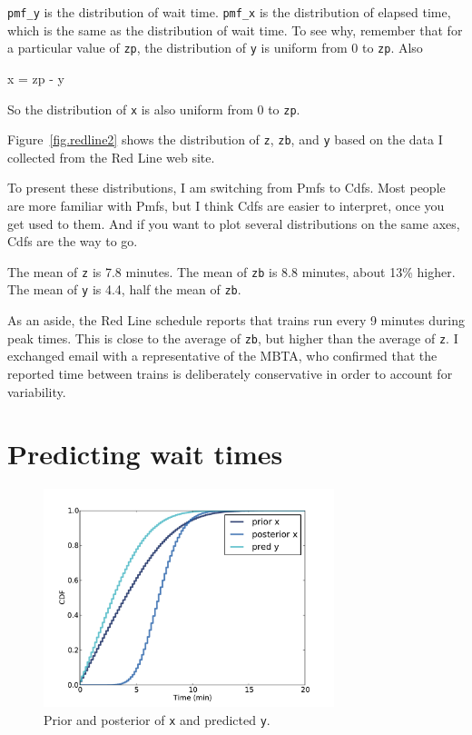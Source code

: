 \documentclass[12pt]{book}
\theoremstyle{exercise}
\begin{document}
\verb"pmf_y" is the distribution of wait time.  \verb"pmf_x" is the
distribution of elapsed time, which is the same as the distribution of
wait time.  To see why, remember that for a particular value of
{\tt zp}, the distribution of {\tt y} is uniform from 0 to {\tt zp}.
Also
%
\begin{code}
x = zp - y
\end{code}
%
So the distribution of {\tt x} is also uniform from 0 to {\tt zp}.

Figure~\ref{fig.redline2} shows the distribution of {\tt z}, {\tt zb},
and {\tt y} based on the data I collected from the Red Line web site.

To present these distributions, I am switching from Pmfs to Cdfs.
Most people are more familiar with Pmfs, but I think Cdfs are easier
to interpret, once you get used to them.  And if you want to plot
several distributions on the same axes, Cdfs are the way to go.

The mean of {\tt z} is 7.8 minutes.  The mean of {\tt zb} is 8.8
minutes, about 13\% higher.  The mean of {\tt y} is 4.4, half
the mean of {\tt zb}.

As an aside, the Red Line schedule reports that trains run every
9 minutes during peak times.  This is close to the average of
{\tt zb}, but higher than the average of {\tt z}.  I exchanged email
with a representative of the MBTA, who confirmed that the reported
time between trains is deliberately conservative in order to
account for variability.


\section{Predicting wait times}
\label{elapsed}

\begin{figure}
\centerline{\includegraphics[height=2.5in]{figs/redline3.pdf}}
\caption{Prior and posterior of {\tt x} and predicted {\tt y}. }
\label{fig.redline3}
\end{figure}
\end{document}
